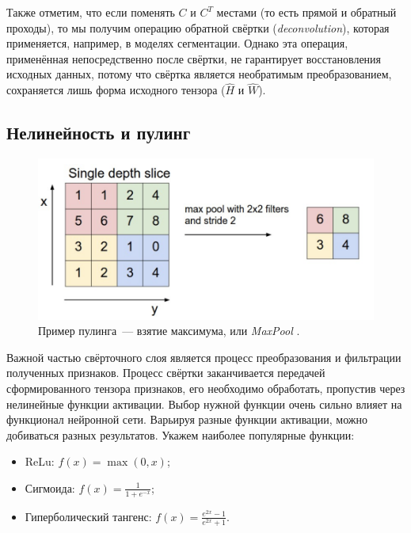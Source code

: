\documentclass[12pt, fleqn]{article}
\begin{document}
    Также отметим, что если поменять $C$ и $C^T$ местами (то есть прямой и обратный проходы), то мы получим операцию 
    обратной свёртки (\textit{deconvolution}), которая применяется, например, в моделях сегментации. Однако эта 
    операция, применённая непосредственно после свёртки, не гарантирует восстановления исходных данных, потому что свёртка является 
    необратимым преобразованием, сохраняется лишь форма исходного тензора ($\hat{H}$ и $\hat{W}$).
        
    \subsection{Нелинейность и пулинг}

    \begin{figure}[ht]
        \centering
        \includegraphics[scale=0.5]{pics/maxpooling.png}
        \caption{Пример пулинга~--- взятие максимума, или \textit{MaxPool} \cite{cs231n}.}
        \label{maxpooling}
    \end{figure}

    Важной частью свёрточного слоя является процесс преобразования и фильтрации полученных
    признаков. Процесс свёртки заканчивается передачей сформированного тензора признаков, его
    необходимо обработать, пропустив через нелинейные функции активации. Выбор нужной
    функции очень сильно влияет на функционал нейронной сети. Варьируя разные функции активации,
    можно добиваться разных результатов. Укажем наиболее популярные функции:

    \begin{itemize}
        \item ReLu: $f(x) = \max(0, x)$;
        \item Сигмоида: $f(x) = \frac{1}{1 + e^{-x}}$;
        \item Гиперболический тангенс: $f(x) = \frac{e^{2x} - 1}{e^{2x} + 1}$.
    \end{itemize}
\end{document}
